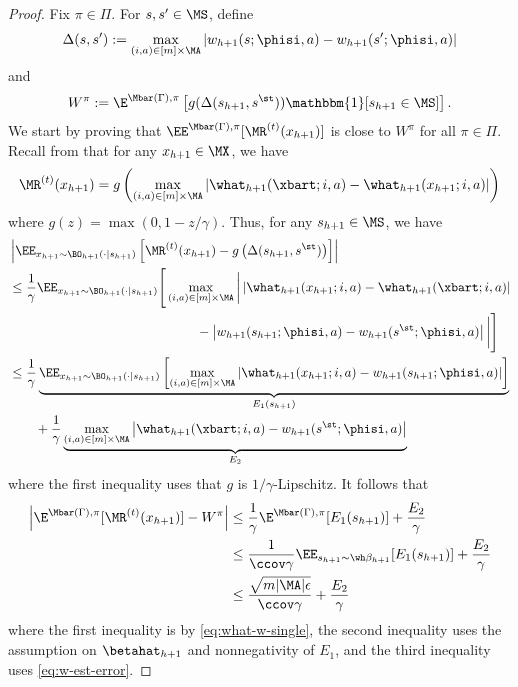 \begin{proof}
\iffalse
For any $\pi \in \Pi$, we have by definition of $\MR^{(t)}$ (\lineref{line:rt-def}) that
\[\E^{\Mbar(\Gamma),\pi}[\MR^{(t)}(x_{h+1})] = \E^{\Mbar(\Gamma),\pi} \left[g\left(\max_{(i,a) \in [m]\times\MA} |\what_{h+1}(\xbart;i,a) - \what_{h+1}(x_{h+1};i,a)|\right)\mathbbm{1}[s_{h+1}\in\MS]\right]\]
\fi
Fix $\pi \in \Pi$. For $s,s' \in \MS$, define \[\Delta(s,s') := \max_{(i,a) \in [m]\times\MA} |w_{h+1}(s;\phisi,a)-w_{h+1}(s';\phisi,a)|\] and
\[W^\pi := \E^{\Mbar(\Gamma),\pi} \left[g(\Delta(s_{h+1}, s^\st))\mathbbm{1}[s_{h+1}\in\MS]\right].\]
We start by proving that $\EE^{\Mbar(\Gamma),\pi}[\MR^{(t)}(x_{h+1})]$ is close to $W^\pi$ for all $\pi \in \Pi$. Recall from  that for any $x_{h+1} \in \MX$, we have \[\MR^{(t)}(x_{h+1}) = g\left(\max_{(i,a) \in [m]\times\MA} |\what_{h+1}(\xbart;i,a) - \what_{h+1}(x_{h+1};i,a)|\right)\]
where $g(z) = \max(0, 1-z/\gamma)$. Thus, for any $s_{h+1} \in \MS$, we have
\begin{align}
&\left|\EE_{x_{h+1}\sim\BO_{h+1}(\cdot|s_{h+1})}\left[ \MR^{(t)}(x_{h+1}) - g\left(\Delta(s_{h+1},s^\st)\right)\right]\right|\nonumber \\ 
&\leq \frac{1}{\gamma}\EE_{x_{h+1}\sim\BO_{h+1}(\cdot\mid{}s_{h+1})} \Bigg[\max_{(i,a) \in [m]\times\MA} \bigg| \left|\what_{h+1}(x_{h+1};i,a) - \what_{h+1}(\xbart;i,a)\right| \nonumber\\
&\hspace{14.3em}- \left| w_{h+1}(s_{h+1};\phisi,a) - w_{h+1}(s^\st;\phisi,a)\right|\bigg|\Bigg] \nonumber\\ 
&\leq \frac{1}{\gamma}\underbrace{\EE_{x_{h+1}\sim\BO_{h+1}(\cdot\mid{}s_{h+1})} \left[\max_{(i,a) \in [m]\times\MA} \left| \what_{h+1}(x_{h+1};i,a) - w_{h+1}(s_{h+1};\phisi,a)\right|\right]}_{E_1(s_{h+1})} \nonumber\\
&\qquad+ \frac{1}{\gamma} \underbrace{\max_{(i,a) \in [m]\times\MA} \left| \what_{h+1}(\xbart;i,a) - w_{h+1}(s^\st;\phisi,a)\right|}_{E_2} \label{eq:what-w-single}
\end{align}
where the first inequality uses that $g$ is $1/\gamma$-Lipschitz. It follows that
\begin{align}
\left| \E^{\Mbar(\Gamma),\pi}[\MR^{(t)}(x_{h+1})] - W^\pi\right|
&\leq \frac{1}{\gamma} \E^{\Mbar(\Gamma),\pi}[E_1(s_{h+1})] + \frac{E_2}{\gamma} \nonumber\\ 
&\leq \frac{1}{\ccov \gamma} \EE_{s_{h+1} \sim \wh\beta_{h+1}}[E_1(s_{h+1})] + \frac{E_2}{\gamma} \nonumber\\ 
&\leq \frac{\sqrt{m|\MA|\epsilon}}{\ccov \gamma} + \frac{E_2}{\gamma} \label{eq:rt-wpi-diff}
\end{align}
where the first inequality is by \cref{eq:what-w-single}, the second inequality uses the assumption on $\betahat_{h+1}$ and nonnegativity of $E_1$, and the third inequality uses \cref{eq:w-est-error}. 


\end{proof}
